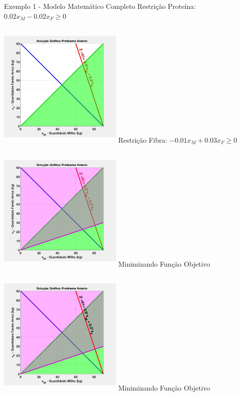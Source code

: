 \documentclass{beamer}
\begin{document}
\begin{frame}
\begin{columns}
\begin{column}{0.8\textwidth}
\begin{exampleblock}{Exemplo 1 - Modelo Matemático Completo}
{				}
				\only<13>
				{	
					Restrição Proteína: $0.02x_M-0.02x_F \ge 0$  \\~\\
					\includegraphics[width=6cm,height=6cm]{MatLab/aviario_11.png}
				}
				\only<14>
				{	
					Restrição Fibra: $-0.01x_M+0.03x_F \ge 0$ \\~\\
					\includegraphics[width=6cm,height=6cm]{MatLab/aviario_12.png}
				}
				\only<15>
				{	
					Minimizando Função Objetivo \\~\\
					\includegraphics[width=6cm,height=6cm]{MatLab/aviario_13.png}
				}
				\only<16>
				{	
					Minimizando Função Objetivo \\~\\
}
\end{exampleblock}
\end{column}
\end{columns}
\end{frame}
\end{document}
